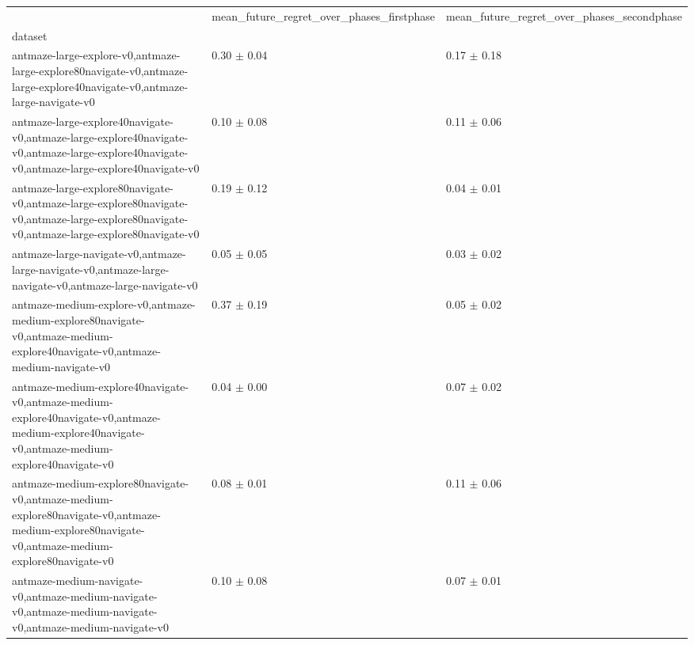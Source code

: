 \begin{tabular}{lll}
\toprule
 & mean_future_regret_over_phases_firstphase & mean_future_regret_over_phases_secondphase \\
dataset &  &  \\
\midrule
antmaze-large-explore-v0,antmaze-large-explore80navigate-v0,antmaze-large-explore40navigate-v0,antmaze-large-navigate-v0 & 0.30 $\pm$ 0.04 & 0.17 $\pm$ 0.18 \\
antmaze-large-explore40navigate-v0,antmaze-large-explore40navigate-v0,antmaze-large-explore40navigate-v0,antmaze-large-explore40navigate-v0 & 0.10 $\pm$ 0.08 & 0.11 $\pm$ 0.06 \\
antmaze-large-explore80navigate-v0,antmaze-large-explore80navigate-v0,antmaze-large-explore80navigate-v0,antmaze-large-explore80navigate-v0 & 0.19 $\pm$ 0.12 & 0.04 $\pm$ 0.01 \\
antmaze-large-navigate-v0,antmaze-large-navigate-v0,antmaze-large-navigate-v0,antmaze-large-navigate-v0 & 0.05 $\pm$ 0.05 & 0.03 $\pm$ 0.02 \\
antmaze-medium-explore-v0,antmaze-medium-explore80navigate-v0,antmaze-medium-explore40navigate-v0,antmaze-medium-navigate-v0 & 0.37 $\pm$ 0.19 & 0.05 $\pm$ 0.02 \\
antmaze-medium-explore40navigate-v0,antmaze-medium-explore40navigate-v0,antmaze-medium-explore40navigate-v0,antmaze-medium-explore40navigate-v0 & 0.04 $\pm$ 0.00 & 0.07 $\pm$ 0.02 \\
antmaze-medium-explore80navigate-v0,antmaze-medium-explore80navigate-v0,antmaze-medium-explore80navigate-v0,antmaze-medium-explore80navigate-v0 & 0.08 $\pm$ 0.01 & 0.11 $\pm$ 0.06 \\
antmaze-medium-navigate-v0,antmaze-medium-navigate-v0,antmaze-medium-navigate-v0,antmaze-medium-navigate-v0 & 0.10 $\pm$ 0.08 & 0.07 $\pm$ 0.01 \\
\bottomrule
\end{tabular}
